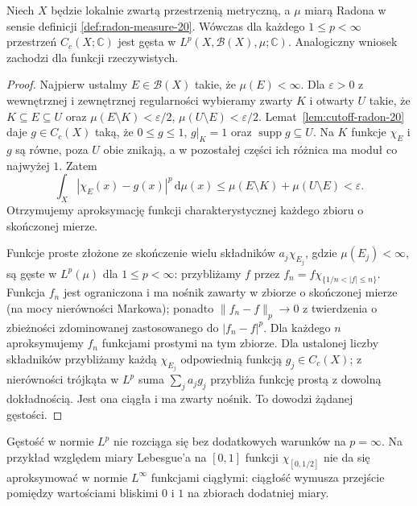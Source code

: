 \begin{twierdzenie}
\label{thm:cc-dense-lp-radon-20}
Niech $X$ będzie lokalnie zwartą przestrzenią metryczną,
a $\mu$ miarą Radona w sensie definicji
\ref{def:radon-measure-20}. Wówczas dla każdego
$1\le p<\infty$ przestrzeń $C_c(X;\mathbb C)$ jest
gęsta w $L^p(X,\mathcal B(X),\mu;\mathbb C)$.
Analogiczny wniosek zachodzi dla funkcji rzeczywistych.
\end{twierdzenie}
\begin{proof}
Najpierw ustalmy $E\in\mathcal B(X)$ takie, że
$\mu(E)<\infty$. Dla $\varepsilon>0$ z wewnętrznej
i zewnętrznej regularności wybieramy zwarty $K$
i otwarty $U$ takie, że
$K\subseteq E\subseteq U$ oraz
$\mu(E\setminus K)<\varepsilon/2$,
$\mu(U\setminus E)<\varepsilon/2$.
Lemat~\ref{lem:cutoff-radon-20} daje $g\in C_c(X)$
taką, że $0\le g\le1$, $g|_K=1$ oraz
$\operatorname{supp}g\subseteq U$.
Na $K$ funkcje $\chi_E$ i $g$ są równe, poza $U$
obie znikają, a w pozostałej części ich różnica
ma moduł co najwyżej $1$. Zatem
\[
 \int_X|\chi_E(x)-g(x)|^p\,\mathrm d\mu(x)
 \le\mu(E\setminus K)+\mu(U\setminus E)
 <\varepsilon.
\]
Otrzymujemy aproksymację funkcji charakterystycznej
każdego zbioru o skończonej mierze.

Funkcje proste złożone ze skończenie wielu składników
$a_j\chi_{E_j}$, gdzie $\mu(E_j)<\infty$, są gęste
w $L^p(\mu)$ dla $1\le p<\infty$:
przybliżamy $f$ przez
$f_n=f\chi_{\{1/n<|f|\le n\}}$.
Funkcja $f_n$ jest ograniczona i ma nośnik
zawarty w zbiorze o skończonej mierze
(na mocy nierówności Markowa); ponadto
$\|f_n-f\|_p\to0$ z twierdzenia o zbieżności
zdominowanej zastosowanego do $|f_n-f|^p$.
Dla każdego $n$ aproksymujemy $f_n$
funkcjami prostymi na tym zbiorze.
Dla ustalonej liczby składników przybliżamy
każdą $\chi_{E_j}$ odpowiednią funkcją $g_j\in C_c(X)$;
z nierówności trójkąta w $L^p$ suma
$\sum_ja_jg_j$ przybliża funkcję prostą z dowolną
dokładnością. Jest ona ciągła i ma zwarty nośnik.
To dowodzi żądanej gęstości.
\end{proof}

\begin{uwaga}
Gęstość w normie $L^p$ nie rozciąga się bez dodatkowych
warunków na $p=\infty$. Na przykład względem miary
Lebesgue'a na $[0,1]$ funkcji $\chi_{[0,1/2]}$
nie da się aproksymować w normie $L^\infty$
funkcjami ciągłymi: ciągłość wymusza przejście pomiędzy
wartościami bliskimi $0$ i $1$ na zbiorach dodatniej miary.
\end{uwaga}

